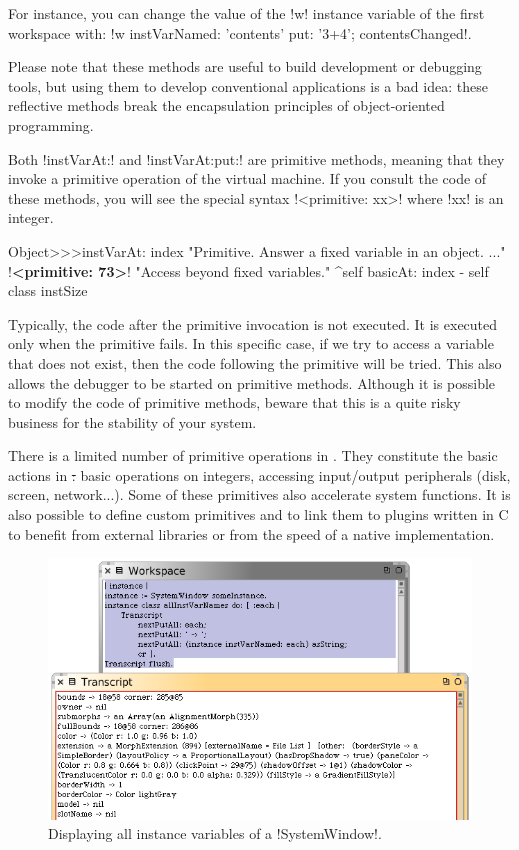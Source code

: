 \documentclass[a4paper,10pt,twoside]{book}
\begin{document}
For instance, you can change the value of the \ct!w! instance variable of the first workspace with: \ct!w instVarNamed: 'contents' put: '3+4'; contentsChanged!.

Please note that these methods are useful to build development or debugging tools, but using them to develop conventional applications is a bad idea: these reflective methods break the encapsulation principles of object-oriented programming.

Both \ct!instVarAt:! and \ct!instVarAt:put:! are primitive methods, meaning that they invoke a primitive operation of the \squeak virtual machine.
If you consult the code of these methods, you will see the special syntax \ct!<primitive: xx>! where \ct!xx! is an integer.

\begin{code}{}
Object>>>instVarAt: index 
	"Primitive. Answer a fixed variable in an object. ..."
	!\textbf{<primitive: 73>}!
	"Access beyond fixed variables."
	^self basicAt: index - self class instSize		
\end{code}

Typically, the code after the primitive invocation is not executed.
It is executed only when the primitive fails. In this specific case, if we try to access a variable that does not exist, then the code following the primitive will be tried.
This also allows the debugger to be started on primitive methods.
Although it is possible to modify the code of primitive methods, beware that this is a quite risky business for the stability of your \squeak system.

There is a limited number of primitive operations in \squeak. They constitute the basic actions in \st: basic operations on integers, accessing input/output peripherals (disk, screen, network...).
Some of these primitives also accelerate system functions.
It is also possible to define custom primitives and to link them to plugins written in C to benefit from external libraries or from the speed of a native implementation.

\begin{figure}[ht]\centering
	\includegraphics[width=\linewidth]{allInstanceVariables}
	\caption{Displaying all instance variables of a \ct!SystemWindow!.\label{fig:allInstanceVariables}}
\end{figure}
\end{document}
